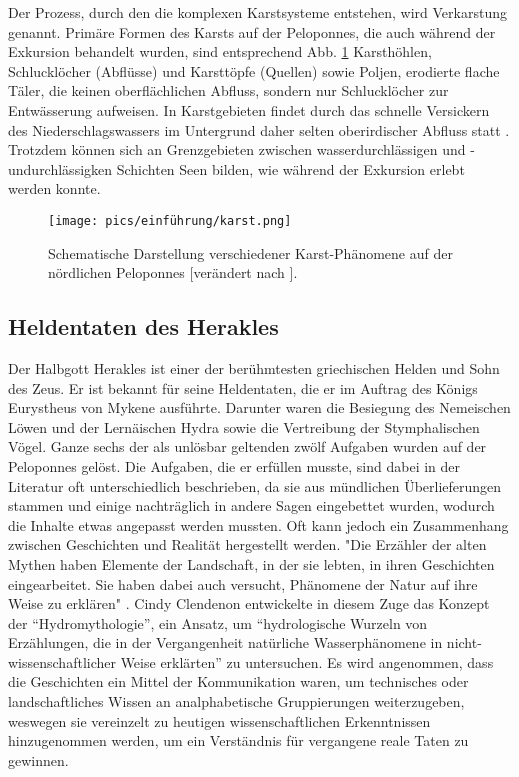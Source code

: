 \documentclass[preprint]{geomorphica} %
\begin{document}
Der Prozess, durch den die komplexen Karstsysteme entstehen, wird Verkarstung genannt. Primäre Formen des Karsts auf der Peloponnes, die auch während der Exkursion behandelt wurden, sind entsprechend Abb. \ref{pic:karst} Karsthöhlen, Schlucklöcher (Abflüsse) und Karsttöpfe (Quellen) sowie Poljen, erodierte flache Täler, die keinen oberflächlichen Abfluss, sondern nur Schlucklöcher zur Entwässerung aufweisen. In Karstgebieten findet durch das schnelle Versickern des Niederschlagswassers im Untergrund daher selten oberirdischer Abfluss statt \cite{unkelHydraHermesHerkules2020}. Trotzdem können sich an Grenzgebieten zwischen wasserdurchlässigen und -undurchlässigken Schichten Seen bilden, wie während der Exkursion erlebt werden konnte.

\begin{figure}[h]
    \centering
    \texttt{[image: pics/einführung/karst.png]}
    \caption{Schematische Darstellung verschiedener Karst-Phänomene auf der nördlichen Peloponnes [verändert nach \cite{unkelHydraHermesHerkules2020}].}
    \label{pic:karst}
\end{figure}

\subsection*{Heldentaten des Herakles}

Der Halbgott Herakles ist einer der berühmtesten griechischen Helden und Sohn des Zeus. Er ist bekannt für seine Heldentaten, die er im Auftrag des Königs Eurystheus von Mykene ausführte. Darunter waren die Besiegung des Nemeischen Löwen und der Lernäischen Hydra sowie die Vertreibung der Stymphalischen Vögel. Ganze sechs der als unlösbar geltenden zwölf Aufgaben wurden auf der Peloponnes gelöst. Die Aufgaben, die er erfüllen musste, sind dabei in der Literatur oft unterschiedlich beschrieben, da sie aus mündlichen Überlieferungen stammen und einige nachträglich in andere Sagen eingebettet wurden, wodurch die Inhalte etwas angepasst werden mussten. Oft kann jedoch ein Zusammenhang zwischen Geschichten und Realität hergestellt werden. "Die Erzähler der alten Mythen haben Elemente der Landschaft, in der sie lebten, in ihren Geschichten eingearbeitet. Sie haben dabei auch versucht, Phänomene der Natur auf ihre Weise zu erklären" \cite{unkelHydraHermesHerkules2020}. Cindy Clendenon entwickelte in diesem Zuge das Konzept der “Hydromythologie”, ein Ansatz, um “hydrologische Wurzeln von Erzählungen, die in der Vergangenheit natürliche Wasserphänomene in nicht-wissenschaftlicher Weise erklärten” \cite{Clendenon2009} zu untersuchen. Es wird angenommen, dass die Geschichten ein Mittel der Kommunikation waren, um technisches oder landschaftliches Wissen an analphabetische Gruppierungen weiterzugeben, weswegen sie vereinzelt zu heutigen wissenschaftlichen Erkenntnissen hinzugenommen werden, um ein Verständnis für vergangene reale Taten zu gewinnen.
\end{document}
